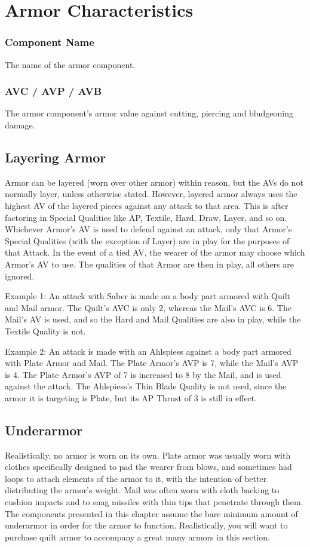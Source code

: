 \documentclass[oneside,11pt,english]{book}
\begin{document}
\section{Armor Characteristics}

\subsubsection{Component Name}
The name of the armor component.

\subsubsection{AVC / AVP / AVB}
The armor component’s armor value against cutting, piercing and bludgeoning damage.

\subsection{Layering Armor}
Armor can be layered (worn over other armor) within reason, but the AVs do not normally layer, unless otherwise 
stated. However, layered armor always uses the highest AV of the layered pieces against any attack to that area. This is
after factoring in Special Qualities like AP, Textile, Hard, Draw, Layer, and so on.
Whichever Armor’s AV is used to defend against an attack, only that Armor’s Special Qualities (with the exception of 
Layer) are in play for the purposes of that Attack. In the event of a tied AV, the wearer of the armor may choose which 
Armor’s AV to use. The qualities of that Armor are then in play, all others are ignored.

Example 1: An attack with Saber is made on a body part armored with Quilt and Mail armor. The Quilt’s AVC is only 
2, whereas the Mail’s AVC is 6. The Mail’s AV is used, and so the Hard and Mail Qualities are also in play, while the 
Textile Quality is not.

Example 2: An attack is made with an Ahlspiess against a body part armored with Plate Armor and Mail. The Plate 
Armor’s AVP is 7, while the Mail’s AVP is 4. The Plate Armor’s AVP of 7 is increased to 8 by the Mail, and is used 
against the attack. The Ahlspiess’s Thin Blade Quality is not used, since the armor it is targeting is Plate, but its AP Thrust of 3 is still in effect.

\subsection{Underarmor}
Realistically, no armor is worn on its own. Plate armor was usually worn with clothes specifically designed to pad the 
wearer from blows, and sometimes had loops to attach elements of the armor to it, with the intention of better 
distributing the armor’s weight. Mail was often worn with cloth backing to cushion impacts and to snag missiles with 
thin tips that penetrate through them.
The components presented in this chapter assume the bare minimum amount of underarmor in order for the armor to 
function. Realistically, you will want to purchase quilt armor to accompany a great many armors in this section.
\end{document}
